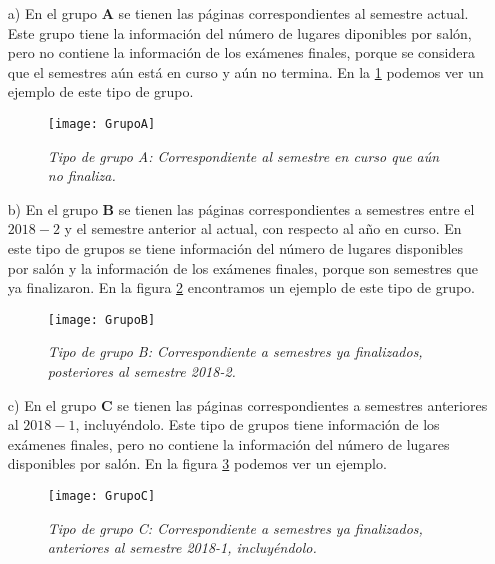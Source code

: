 \begin{enumerate}
\item[a)] En el grupo \textbf{A} se tienen las páginas correspondientes al semestre actual. Este grupo tiene la información del número de lugares diponibles por salón, pero no contiene la información de los exámenes finales, porque se considera que el semestres aún está en curso y aún no termina. En la \figurename{\ref{GpoA}} podemos ver un ejemplo de este tipo de grupo.

\begin{figure}[H]
\centering
\texttt{[image: GrupoA]} %
\caption[\textit{Tipo de grupo A}]{\textit{Tipo de grupo A: Correspondiente al semestre en curso que aún no finaliza.}}\label{GpoA}
\end{figure}


\item[b)] En el grupo \textbf{B} se tienen las páginas correspondientes a semestres entre el $2018-2$ y el semestre anterior al actual, con respecto al año en curso. En este tipo de grupos se tiene información del número de lugares disponibles por salón y la información de los exámenes finales, porque son semestres que ya finalizaron. En la figura \figurename{\ref{GpoB}} encontramos un ejemplo de este tipo de grupo.

\begin{figure}[H]
\centering
\texttt{[image: GrupoB]} %
\caption[\textit{Tipo de grupo B}]{\textit{Tipo de grupo B: Correspondiente a semestres ya finalizados, posteriores al semestre 2018-2.}}\label{GpoB}
\end{figure}

\item[c)] En el grupo \textbf{C} se tienen las páginas correspondientes a semestres anteriores al $2018-1$, incluyéndolo. Este tipo de grupos tiene información de los exámenes finales, pero no contiene la información del número de lugares disponibles por salón. En la figura \figurename{\ref{GpoC}} podemos ver un ejemplo.

\begin{figure}[H]
\centering
\texttt{[image: GrupoC]} %
\caption[\textit{Tipo de grupo C}]{\textit{Tipo de grupo C: Correspondiente a semestres ya finalizados, anteriores al semestre 2018-1, incluyéndolo.}}\label{GpoC}
\end{figure}
\end{enumerate}

